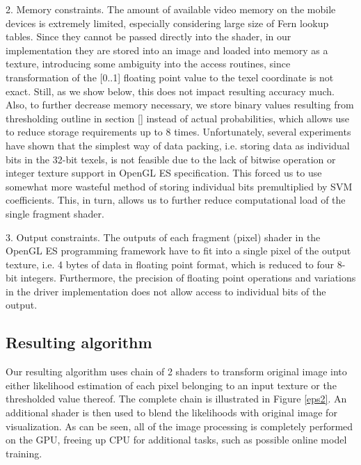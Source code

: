 \documentclass[10pt,twocolumn, a4paper]{article}
\begin{document}
2.	 Memory constraints. The amount of available video memory on the mobile devices is extremely limited, especially considering large size of Fern lookup tables. Since they cannot be passed directly into the shader, in our implementation they are stored into an image and loaded into memory as a texture, introducing some ambiguity into the access routines, since transformation of the [0..1] floating point value to the texel coordinate is not exact. Still, as we show below, this does not impact resulting accuracy much. Also, to further decrease memory necessary, we store binary values resulting from thresholding outline in section [] instead of actual probabilities, which allows use to reduce storage requirements up to 8 times. Unfortunately, several experiments have shown that the simplest way of data packing, i.e. storing data as individual bits in the 32-bit texels, is not feasible due to the lack of bitwise operation or integer texture support in OpenGL ES specification. This forced us to use somewhat more wasteful method of storing individual bits premultiplied by SVM coefficients. This, in turn, allows us to further reduce computational load of the single fragment shader.

3.	Output constraints. The outputs of each fragment (pixel) shader in the OpenGL ES programming framework have to fit into a single pixel of the output texture, i.e. 4 bytes of data in floating point format, which is reduced to four 8-bit integers. Furthermore, the precision of floating point operations and variations in the driver implementation does not allow access to individual bits of the output. 


\subsection{Resulting algorithm}
\label{ra}
Our resulting algorithm uses chain of 2 shaders to transform original image into either likelihood estimation of each pixel belonging to an input texture or the thresholded value thereof.  The complete chain is illustrated in Figure \ref{eps2}. An additional shader is then used to blend the likelihoods with original image for visualization. As can be seen, all of the image processing is completely performed on the GPU, freeing up CPU for additional tasks, such as possible online model training.
\end{document}
